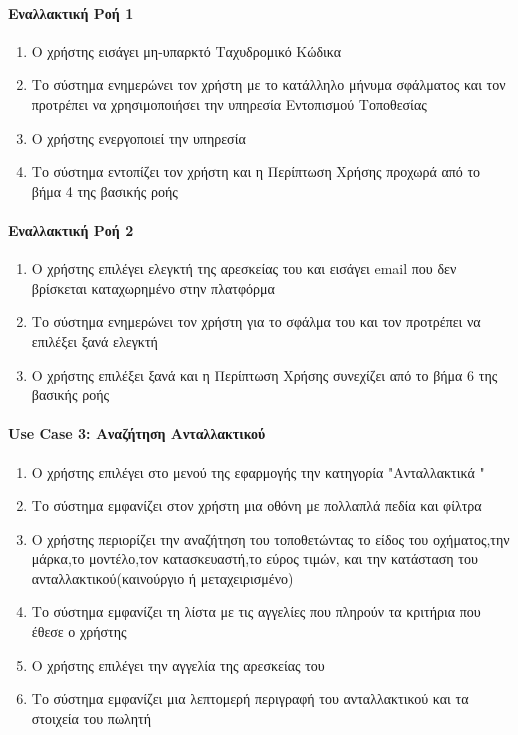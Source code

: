 \documentclass{../ol-softwaremanual}
\begin{document}
	\paragraph{Εναλλακτική Ροή 1}
	
	\begin{enumerate}
		\item Ο χρήστης εισάγει μη-υπαρκτό Ταχυδρομικό Κώδικα
		\item Το σύστημα ενημερώνει τον χρήστη με το κατάλληλο μήνυμα σφάλματος και τον προτρέπει να χρησιμοποιήσει την υπηρεσία Εντοπισμού Τοποθεσίας
		\item Ο χρήστης ενεργοποιεί την υπηρεσία 
		\item Το σύστημα εντοπίζει τον χρήστη και η Περίπτωση Χρήσης προχωρά από το βήμα 4 της βασικής ροής
	\end{enumerate}

	\paragraph{Εναλλακτική Ροή 2}
	
	\begin{enumerate}
		\item Ο χρήστης επιλέγει ελεγκτή της αρεσκείας του και εισάγει \en email \gr που δεν βρίσκεται καταχωρημένο στην πλατφόρμα
		\item Το σύστημα ενημερώνει τον χρήστη για το σφάλμα του και τον προτρέπει να επιλέξει ξανά ελεγκτή
		\item Ο χρήστης επιλέξει ξανά και η Περίπτωση Χρήσης συνεχίζει από το βήμα 6 της βασικής ροής
	\end{enumerate}
	
	
    \paragraph{\en Use Case 3: \gr Αναζήτηση Ανταλλακτικού}	
    
    \begin{enumerate}
    	\item Ο χρήστης επιλέγει στο μενού της εφαρμογής την κατηγορία  \en"\gr Ανταλλακτικά \en"\gr
    	\item Το σύστημα εμφανίζει στον χρήστη μια οθόνη με πολλαπλά πεδία και φίλτρα
    	\item Ο χρήστης περιορίζει την αναζήτηση του τοποθετώντας το είδος του οχήματος,την μάρκα,το μοντέλο,τον κατασκευαστή,το εύρος τιμών, και την κατάσταση του ανταλλακτικού(καινούργιο ή μεταχειρισμένο) 
    	\item Το σύστημα εμφανίζει τη λίστα με τις αγγελίες που πληρούν τα κριτήρια που έθεσε ο χρήστης
    	\item Ο χρήστης επιλέγει την αγγελία της αρεσκείας του
    	\item Το σύστημα εμφανίζει μια λεπτομερή περιγραφή του ανταλλακτικού και τα στοιχεία του πωλητή
    			
    \end{enumerate}
\end{document}
